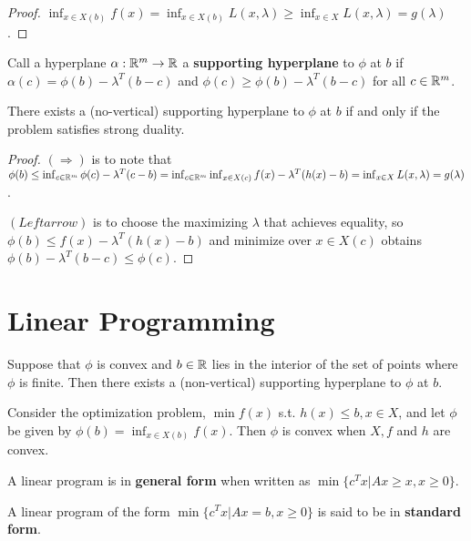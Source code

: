\begin{proof}
  $\inf_{x \in X(b)} f(x) = \inf_{x \in X(b)} L(x, \lambda) \geq
  \inf_{x \in X} L(x, \lambda) = g(\lambda)$.
\end{proof}

\begin{defn}
  \label{sec:optimization-8}
  Call a hyperplane $\alpha: \mathbb{R}^{m} \rightarrow \mathbb{R}$ a
  \textbf{supporting hyperplane} to $\phi$ at $b$ if $\alpha(c) =
  \phi(b) - \lambda^{T}(b-c)$ and $\phi(c) \geq \phi(b) -
  \lambda^{T}(b-c)$ for all $c \in \mathbb{R}^{m}$.
\end{defn}

\begin{thm}
  \label{sec:optimization-10}
  There exists a (no-vertical) supporting hyperplane to $\phi$ at $b$
  if and only if the problem satisfies strong duality.
\end{thm}

\begin{proof}
  $(\Rightarrow)$ is to note that $\phi(b) \leq \inf_{c \in \mathbb{R}^{m}} \phi(c) -
  \lambda^{T}(c - b) = \inf_{c \in \mathbb{R}^{m}} \inf_{x \in X(c)} f(x) -
    \lambda^{T} (h(x) - b) = \inf_{x \in X} L(x, \lambda) =
    g(\lambda)$.

    $(Leftarrow)$ is to choose the maximizing $\lambda$ that achieves
    equality, so $\phi(b) \leq f(x) - \lambda^{T}(h(x) - b)$ and
    minimize over $x \in X(c)$ obtains $\phi(b) - \lambda^{T}(b-c)
    \leq \phi(c)$.
\end{proof}

\section{Linear Programming}
\label{sec:linear-programming}

\begin{thm}
  \label{sec:linear-programming-1}
  Suppose that $\phi$ is convex and $b \in \mathbb{R}$ lies in the interior of
  the set of points where $\phi$ is finite.  Then there exists a
  (non-vertical) supporting hyperplane to $\phi$ at $b$.
\end{thm}

\begin{thm}
  \label{sec:linear-programming-2}
  Consider the optimization problem, $\min f(x)$ s.t. $h(x) \leq b, x
  \in X$, and let $\phi$ be given by $\phi(b) = \inf_{x \in X(b)}
  f(x)$.  Then $\phi$ is convex when $X, f$ and $h$ are convex.
\end{thm}

\begin{defn}
  \label{sec:linear-programming-3}
  A linear program is in \textbf{general form} when written as $\min
  \{ c^{T} x | Ax \geq x, x \geq 0 \}$.

  A linear program of the form $\min \{ c^{T}x | Ax = b, x \geq 0 \} $
  is said to be in \textbf{standard form}.
\end{defn}

